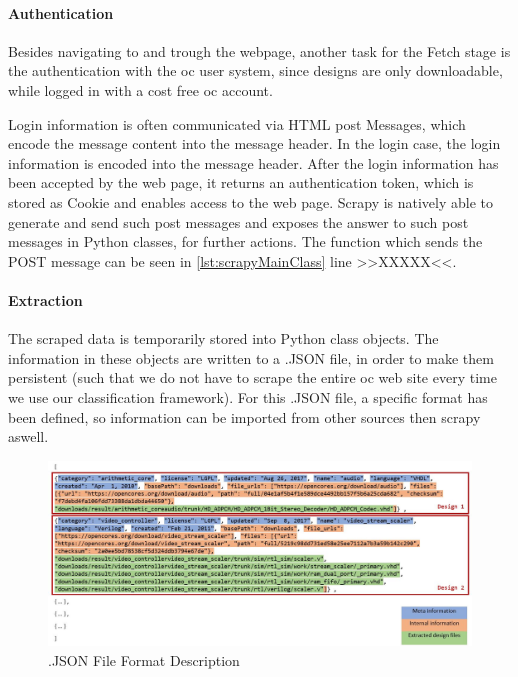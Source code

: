 \paragraph*{Authentication \\}

Besides navigating to and trough the webpage, another task for the Fetch stage is the authentication with the \Gls{oc} user system, since designs are only downloadable, while logged in with a cost free \Gls{oc} account.

Login information is often communicated via \Gls{HTML} \Gls{post} Messages, which encode the message content into the message header. In the login case, the login information is encoded into the message header. After the login information has been accepted by the web page, it returns an authentication token, which is stored as \Gls{Cookie} and enables access to the web page. Scrapy is natively able to generate and send such \Gls{post} messages and exposes the answer to such \Gls{post} messages in Python classes, for further actions. The function which sends the \Gls{POST} message can be seen in \cref{lst:scrapyMainClass} line >>XXXXX<<.

\paragraph*{Extraction \\}


The scraped data is temporarily stored into Python class objects. The information 
in these objects are written to a .JSON file, in order to make them persistent (such
that we do not have to scrape the entire \gls{oc} web site every time we use our 
classification framework). For this .JSON file, a specific format has been defined, 
so information can be imported from other sources then scrapy aswell. 

\begin{figure}[h]
	\centering
	\includegraphics[width=\textwidth,keepaspectratio]{fig/jsonFileFormatDescription.JPG}
	\caption{.JSON File Format Description}
	\label{fig:jsonFormat}
\end{figure}

